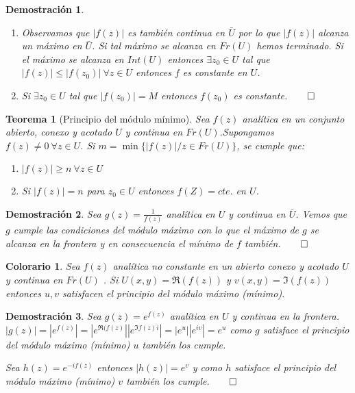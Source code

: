 \documentclass[10pt]{book}
\newtheorem{theorem}{Teorema}[chapter]
\newtheorem*{dem}{Demostración}
\newtheorem{col}{Colorario}[chapter]
\begin{document}
\begin{dem}\ \\
\begin{enumerate}
\item Observamos que $|f(z)|$ es también continua en $\bar{U}$ por lo que $|f(z)|$ alcanza un máximo en $\bar{U}$. Si tal máximo se alcanza en $Fr(U)$ hemos terminado.
Si el máximo se alcanza en  $Int(U)$ entonces $\exists z_0 \in U$ tal que $|f(z)|\leq |f(z_0)| \ \forall z\in U$ entonces $f$ es constante en $U$.
\item Si $\exists z_0 \in U$ tal que $|f(z_0)| = M$ entonces $f(z_0)$ es constante.$\qed$
\end{enumerate}
\end{dem}


\begin{theorem}[Principio del módulo mínimo]
Sea $f(z)$ analítica en un conjunto abierto, conexo y acotado $U$ y continua en $Fr(U)$.Supongamos $f(z)\neq 0\ \forall z\in U$. Si $m =\min \{|f(z)|/ z\in Fr(U)\}$, se cumple que:
\begin{enumerate}
\item $|f(z)|\geq n \ \forall z \in U$
\item Si $|f(z)| = n$ para $z_0 \in U$ entonces $f(Z) = cte.$ en $U$.
\end{enumerate}
\end{theorem}

\begin{dem}
Sea $g(z)= \frac{1}{f(z)}$ analítica en $U$ y continua en $\bar U$. Vemos que $g$ cumple las condiciones del módulo máximo con lo que el máximo de $g$ se alcanza en la frontera y en consecuencia el mínimo de $f$ también.$\qed$
\end{dem}

\begin{col}
Sea $f(z)$ analítica no constante en un abierto conexo y acotado $U$ y continua en $Fr(U)$ . Si $U(x,y) = \Re(f(z))$ y $v(x,y) = \Im(f(z))$ entonces $u,v$ satisfacen el principio del módulo máximo (mínimo).
\end{col}

\begin{dem}
Sea $g(z)= e^{f(z)}$ analítica en $U$ y continua en la frontera. $|g(z)| = |e^{f(z)}| = |e^{\Re(f(z)}||e^{\Im{f(z)}i}| = |e^u||e^{iv}| = e^u$ como $g$ satisface el principio del módulo máximo (mínimo) $u$ también los cumple.

Sea  $ h(z) = e^{-if(z)}$ entonces $|h(z)| = e^v$ y como $h$ satisface el principio del módulo máximo (mínimo) $v$ también los cumple.$\qed$
\end{dem}
\end{document}
